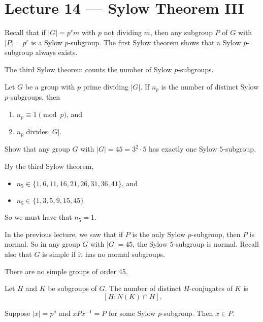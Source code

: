 \section{Lecture 14 — Sylow Theorem III}

Recall that if $|G|=p^rm$ with $p$ not dividing $m$, then any subgroup $P$ of $G$ with $|P|=p^r$ is a Sylow $p$-subgroup. The first Sylow theorem shows that a Sylow $p$-subgroup always exists.

The third Sylow theorem counts the number of Sylow $p$-subgroups.

\begin{theorem}\label{thm:sylow_3}
	Let $G$ be a group with $p$ prime dividing $|G|$. If $n_p$ is the number of distinct Sylow $p$-subgroups, then
	\begin{enumerate}
		\item $n_p\equiv 1\pmod{p}$, and
		\item $n_p$ divides $|G|$.
	\end{enumerate}
\end{theorem}

\begin{example}
	Show that any group $G$ with $|G|=45=3^2\cdot 5$ has exactly one Sylow $5$-subgroup.
	\begin{solution}
	By the third Sylow theorem,
	\begin{itemize}
		\item $n_5\in\{1,6,11,16,21,26,31,36,41\}$, and
		\item $n_5\in\{1,3,5,9,15,45\}$
	\end{itemize}
	So we must have that $n_5=1$.
	\end{solution}
	In the previous lecture, we saw that if $P$ is the only Sylow $p$-subgroup, then $P$ is normal. So in any group $G$ with $|G|=45$, the Sylow $5$-subgroup is normal. Recall also that $G$ is simple if it has no normal subgroups.
\end{example}

\begin{corollary}
	There are no simple groups of order 45.
\end{corollary}

\begin{lemma}
	Let $H$ and $K$ be subgroups of $G$. The number of distinct $H$-conjugates of $K$ is
	$$[H:N(K)\cap H].$$
\end{lemma}

\begin{lemma}\label{lem:conjugate_P}
	Suppose $|x|=p^a$ and $xPx^{-1}=P$ for some Sylow $p$-subgroup. Then $x\in P$.
\end{lemma}

